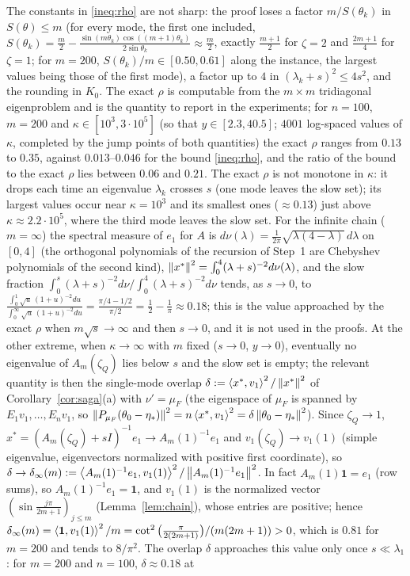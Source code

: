 \begin{remark}
\label{rem:rho}
The constants in \eqref{ineq:rho} are not sharp: the proof loses a factor $m/S(\theta_k)$ in $S(\theta)\le m$ (for every mode, the first one included, $S(\theta_k)=\frac m2-\frac{\sin(m\theta_k)\cos((m+1)\theta_k)}{2\sin\theta_k}\approx\frac m2$, exactly $\frac{m+1}2$ for $\zeta=2$ and $\frac{2m+1}4$ for $\zeta=1$; for $m=200$, $S(\theta_k)/m\in[0.50,0.61]$ along the instance, the largest values being those of the first mode), a factor up to $4$ in $(\lambda_k+s)^2\le4s^2$, and the rounding in $K_0$. The exact $\rho$ is computable from the $m\times m$ tridiagonal eigenproblem and is the quantity to report in the experiments; for $n=100$, $m=200$ and $\kappa\in[10^3,3\cdot10^5]$ (so that $y\in[2.3,40.5]$; $4001$ log-spaced values of $\kappa$, completed by the jump points of both quantities) the exact $\rho$ ranges from $0.13$ to $0.35$, against $0.013$--$0.046$ for the bound \eqref{ineq:rho}, and the ratio of the bound to the exact $\rho$ lies between $0.06$ and $0.21$. The exact $\rho$ is not monotone in $\kappa$: it drops each time an eigenvalue $\lambda_k$ crosses $s$ (one mode leaves the slow set); its largest values occur near $\kappa=10^3$ and its smallest ones ($\approx0.13$) just above $\kappa\approx2.2\cdot10^5$, where the third mode leaves the slow set. For the infinite chain ($m=\infty$) the spectral measure of $e_1$ for $A$ is $d\nu(\lambda)=\frac1{2\pi}\sqrt{\lambda(4-\lambda)}\,d\lambda$ on $[0,4]$ (the orthogonal polynomials of the recursion of Step~1 are Chebyshev polynomials of the second kind), $\left\|x^\ast\right\|^2=\int_0^4(\lambda+s)^{-2}d\nu(\lambda)$, and the slow fraction $\int_0^s(\lambda+s)^{-2}d\nu/\int_0^4(\lambda+s)^{-2}d\nu$ tends, as $s\to0$, to $\frac{\int_0^1\sqrt u\,(1+u)^{-2}du}{\int_0^\infty\sqrt u\,(1+u)^{-2}du}=\frac{\pi/4-1/2}{\pi/2}=\frac12-\frac1\pi\approx0.18$; this is the value approached by the exact $\rho$ when $m\sqrt s\to\infty$ and then $s\to0$, and it is not used in the proofs. At the other extreme, when $\kappa\to\infty$ with $m$ fixed ($s\to0$, $y\to0$), eventually no eigenvalue of $A_m(\zeta_Q)$ lies below $s$ and the slow set is empty; the relevant quantity is then the single-mode overlap $\delta:=\left\langle x^\ast, v_1 \right\rangle^2/\left\|x^\ast\right\|^2$ of Corollary~\ref{cor:saga}(a) with $\nu'=\mu_F$ (the eigenspace of $\mu_F$ is spanned by $E_1v_1,\dots,E_nv_1$, so $\left\|P_{\mu_F}(\theta_0-\eta_\ast)\right\|^2=n\left\langle x^\ast, v_1 \right\rangle^2=\delta\left\|\theta_0-\eta_\ast\right\|^2$). Since $\zeta_Q\to1$, $x^\ast=(A_m(\zeta_Q)+sI)^{-1}e_1\to A_m(1)^{-1}e_1$ and $v_1(\zeta_Q)\to v_1(1)$ (simple eigenvalue, eigenvectors normalized with positive first coordinate), so $\delta\to\delta_\infty(m):=\left\langle A_m(1)^{-1}e_1, v_1(1) \right\rangle^2/\left\|A_m(1)^{-1}e_1\right\|^2$. In fact $A_m(1)\mathbf 1=e_1$ (row sums), so $A_m(1)^{-1}e_1=\mathbf 1$, and $v_1(1)$ is the normalized vector $(\sin\frac{j\pi}{2m+1})_{j\le m}$ (Lemma~\ref{lem:chain}), whose entries are positive; hence $\delta_\infty(m)=\left\langle \mathbf 1, v_1(1) \right\rangle^2/m=\cot^2\big(\frac{\pi}{2(2m+1)}\big)/(m(2m+1))>0$, which is $0.81$ for $m=200$ and tends to $8/\pi^2$. The overlap $\delta$ approaches this value only once $s\ll\lambda_1$: for $m=200$ and $n=100$, $\delta\approx0.18$ at 
\end{remark}
